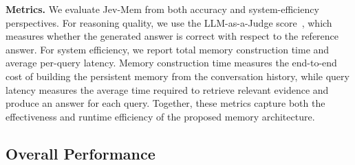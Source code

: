 \documentclass[11pt]{article}
\begin{document}
\noindent\textbf{Metrics.}
We evaluate Jev-Mem from both accuracy and system-efficiency perspectives. For reasoning quality, we use the LLM-as-a-Judge score~\citep{zheng2023judging}, which measures whether the generated answer is correct with respect to the reference answer. 
For system efficiency, we report total memory construction time and average per-query latency. Memory construction time measures the end-to-end cost of building the persistent memory from the conversation history, while query latency measures the average time required to retrieve relevant evidence and produce an answer for each query. Together, these metrics capture both the effectiveness and runtime efficiency of the proposed memory architecture.




\begin{table}[t]
\centering
\caption{Performance on the LoCoMo benchmark evaluated using the LLM-as-a-Judge metric. Higher scores indicate better performance. LLM model is based on gpt-4o-mini.}
\label{tab:locomo-main}

\end{table}

\subsection{Overall Performance}
\label{sec:overall}
\end{document}
